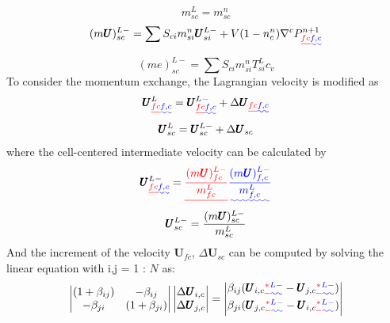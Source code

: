 \documentclass[preprint,12pt]{elsarticle}
\providecommand{\DIFadd}[1]{{\protect\color{blue}\uwave{#1}}} %
\providecommand{\DIFdel}[1]{{\protect\color{red}\sout{#1}}}                      %
\providecommand{\DIFaddbegin}{} %
\providecommand{\DIFaddend}{} %
\providecommand{\DIFdelbegin}{} %
\providecommand{\DIFdelend}{} %
\newcommand{\DIFscaledelfig}{0.5}
\newlength{\DIFdelgraphicswidth} %
\newlength{\DIFdelgraphicsheight} %
\newcommand{\DIFaddincludegraphics}[2][]{{\color{blue}\fbox{\DIFOincludegraphics[#1]{#2}}}} %
\newcommand{\DIFdelincludegraphics}[2][]{%
\sbox{\DIFdelgraphicsbox}{\DIFOincludegraphics[#1]{#2}}%
\settoboxwidth{\DIFdelgraphicswidth}{\DIFdelgraphicsbox} %
\settoboxtotalheight{\DIFdelgraphicsheight}{\DIFdelgraphicsbox} %
\scalebox{\DIFscaledelfig}{%
\parbox[b]{\DIFdelgraphicswidth}{\usebox{\DIFdelgraphicsbox}\\[-\baselineskip] \rule{\DIFdelgraphicswidth}{0em}}\llap{\resizebox{\DIFdelgraphicswidth}{\DIFdelgraphicsheight}{%
\setlength{\unitlength}{\DIFdelgraphicswidth}%
\begin{picture}(1,1)%
\thicklines\linethickness{2pt} %
{\color[rgb]{1,0,0}\put(0,0){\framebox(1,1){}}}%
{\color[rgb]{1,0,0}\put(0,0){\line( 1,1){1}}}%
{\color[rgb]{1,0,0}\put(0,1){\line(1,-1){1}}}%
\end{picture}%
}\hspace*{3pt}}} %
} %
\DeclareRobustCommand{\DIFaddbegin}{\DIFOaddbegin \let\includegraphics\DIFaddincludegraphics} %
\DeclareRobustCommand{\DIFaddend}{\DIFOaddend \let\includegraphics\DIFOincludegraphics} %
\DeclareRobustCommand{\DIFdelbegin}{\DIFOdelbegin \let\includegraphics\DIFdelincludegraphics} %
\DeclareRobustCommand{\DIFdelend}{\DIFOaddend \let\includegraphics\DIFOincludegraphics} %
\begin{document}
\begin{equation}
 m_{sc}^L = m_{sc}^n
\end {equation}
%
\begin{equation}
 (m \pmb{U})_{sc}^{L-} = \sum{S_{ci} m_{si}^n \pmb{U}_{si}^{L-}} + V (1-n_c^n) \nabla^c P_{\DIFdelbegin \DIFdel{fc}\DIFdelend \DIFaddbegin \DIFadd{f,c}\DIFaddend }^{n+1}
\end {equation}
%
\begin{equation}
 (me)_{sc}^{L-} =  \sum{S_{ci} m_{si}^n T_{si}^L} c_v
\end {equation}
%
%
To consider the momentum exchange, the Lagrangian velocity is modified as\DIFaddbegin \DIFadd{:
}\DIFaddend %
\begin{equation}
\begin{gathered}
\pmb{U}_{\DIFdelbegin \DIFdel{fc}\DIFdelend \DIFaddbegin \DIFadd{f,c}\DIFaddend }^{L} = \pmb{U}_{\DIFdelbegin \DIFdel{fc}\DIFdelend \DIFaddbegin \DIFadd{f,c}\DIFaddend }^{L-} + \Delta \pmb{U}_{\DIFdelbegin \DIFdel{fc}\DIFdelend \DIFaddbegin \DIFadd{f,c}\DIFaddend } \\
\pmb{U}_{sc}^{L} = \pmb{U}_{sc}^{L-} + \Delta \pmb{U}_{sc}
\end {gathered}
\end {equation}
%
%
where the cell-centered intermediate velocity can be calculated by\DIFaddbegin \DIFadd{:
}\DIFaddend %
\begin{equation}
\begin{gathered}
\pmb{U}_{\DIFdelbegin \DIFdel{fc}\DIFdelend \DIFaddbegin \DIFadd{f,c}\DIFaddend }^{L-} = \DIFdelbegin \DIFdel{\frac{(m \pmb{U})_{fc}^{L-}}{m_{fc}^L} }\DIFdelend \DIFaddbegin \DIFadd{\frac{(m \pmb{U})_{f,c}^{L-}}{m_{f,c}^L} }\DIFaddend \\
\pmb{U}_{sc}^{L-} = \frac{(m \pmb{U})_{sc}^{L-}}{m_{sc}^L} 
\end {gathered}
\end {equation}
%
%
And the increment of the velocity \DIFdelbegin \DIFdel{$\pmb{U}_{fc}$}\DIFdelend \DIFaddbegin \DIFadd{$\pmb{U}_{f,c}$}\DIFaddend , $\Delta \pmb{U}_{sc}$ can be computed by solving the linear equation with i,j = 1 : $N$ as:
%
%
\[ \begin{vmatrix} (1 + \beta_{ij})  &  -\beta_{ij} \\
                  -\beta_{ji}       &  (1 + \beta_{ji})
    \end {vmatrix}
    \begin{vmatrix} \Delta \pmb{U}_{i,c} \\
                    \Delta \pmb{U}_{j,c}
    \end {vmatrix}
    =
    \begin{vmatrix}  \beta_{ij}(\pmb{U}_{i,c}\DIFdelbegin \DIFdel{^{*} }\DIFdelend \DIFaddbegin \DIFadd{^{L-} }\DIFaddend - \pmb{U}_{j,c}\DIFdelbegin \DIFdel{^{*}}\DIFdelend \DIFaddbegin \DIFadd{^{L-}}\DIFaddend ) \\
                    \beta_{ji}(\pmb{U}_{j,c}\DIFdelbegin \DIFdel{^{*} }\DIFdelend \DIFaddbegin \DIFadd{^{L-} }\DIFaddend - \pmb{U}_{i,c}\DIFdelbegin \DIFdel{^{*}}\DIFdelend \DIFaddbegin \DIFadd{^{L-}}\DIFaddend )
    \end {vmatrix}                
\]
\end{document}
